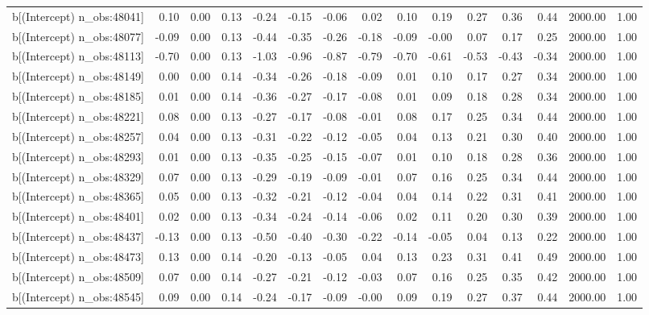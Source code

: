 \begin{table}[ht]
\begin{tabular}{rrrrrrrrrrrrrrr}
  b[(Intercept) n\_obs:48041] & 0.10 & 0.00 & 0.13 & -0.24 & -0.15 & -0.06 & 0.02 & 0.10 & 0.19 & 0.27 & 0.36 & 0.44 & 2000.00 & 1.00 \\ 
  b[(Intercept) n\_obs:48077] & -0.09 & 0.00 & 0.13 & -0.44 & -0.35 & -0.26 & -0.18 & -0.09 & -0.00 & 0.07 & 0.17 & 0.25 & 2000.00 & 1.00 \\ 
  b[(Intercept) n\_obs:48113] & -0.70 & 0.00 & 0.13 & -1.03 & -0.96 & -0.87 & -0.79 & -0.70 & -0.61 & -0.53 & -0.43 & -0.34 & 2000.00 & 1.00 \\ 
  b[(Intercept) n\_obs:48149] & 0.00 & 0.00 & 0.14 & -0.34 & -0.26 & -0.18 & -0.09 & 0.01 & 0.10 & 0.17 & 0.27 & 0.34 & 2000.00 & 1.00 \\ 
  b[(Intercept) n\_obs:48185] & 0.01 & 0.00 & 0.14 & -0.36 & -0.27 & -0.17 & -0.08 & 0.01 & 0.09 & 0.18 & 0.28 & 0.34 & 2000.00 & 1.00 \\ 
  b[(Intercept) n\_obs:48221] & 0.08 & 0.00 & 0.13 & -0.27 & -0.17 & -0.08 & -0.01 & 0.08 & 0.17 & 0.25 & 0.34 & 0.44 & 2000.00 & 1.00 \\ 
  b[(Intercept) n\_obs:48257] & 0.04 & 0.00 & 0.13 & -0.31 & -0.22 & -0.12 & -0.05 & 0.04 & 0.13 & 0.21 & 0.30 & 0.40 & 2000.00 & 1.00 \\ 
  b[(Intercept) n\_obs:48293] & 0.01 & 0.00 & 0.13 & -0.35 & -0.25 & -0.15 & -0.07 & 0.01 & 0.10 & 0.18 & 0.28 & 0.36 & 2000.00 & 1.00 \\ 
  b[(Intercept) n\_obs:48329] & 0.07 & 0.00 & 0.13 & -0.29 & -0.19 & -0.09 & -0.01 & 0.07 & 0.16 & 0.25 & 0.34 & 0.44 & 2000.00 & 1.00 \\ 
  b[(Intercept) n\_obs:48365] & 0.05 & 0.00 & 0.13 & -0.32 & -0.21 & -0.12 & -0.04 & 0.04 & 0.14 & 0.22 & 0.31 & 0.41 & 2000.00 & 1.00 \\ 
  b[(Intercept) n\_obs:48401] & 0.02 & 0.00 & 0.13 & -0.34 & -0.24 & -0.14 & -0.06 & 0.02 & 0.11 & 0.20 & 0.30 & 0.39 & 2000.00 & 1.00 \\ 
  b[(Intercept) n\_obs:48437] & -0.13 & 0.00 & 0.13 & -0.50 & -0.40 & -0.30 & -0.22 & -0.14 & -0.05 & 0.04 & 0.13 & 0.22 & 2000.00 & 1.00 \\ 
  b[(Intercept) n\_obs:48473] & 0.13 & 0.00 & 0.14 & -0.20 & -0.13 & -0.05 & 0.04 & 0.13 & 0.23 & 0.31 & 0.41 & 0.49 & 2000.00 & 1.00 \\ 
  b[(Intercept) n\_obs:48509] & 0.07 & 0.00 & 0.14 & -0.27 & -0.21 & -0.12 & -0.03 & 0.07 & 0.16 & 0.25 & 0.35 & 0.42 & 2000.00 & 1.00 \\ 
  b[(Intercept) n\_obs:48545] & 0.09 & 0.00 & 0.14 & -0.24 & -0.17 & -0.09 & -0.00 & 0.09 & 0.19 & 0.27 & 0.37 & 0.44 & 2000.00 & 1.00 \\ 

\end{tabular}
\end{table}
